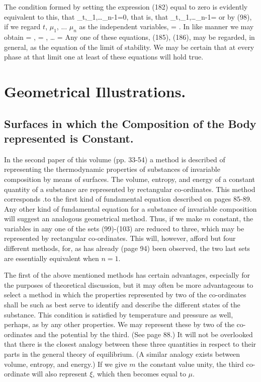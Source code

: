 \documentclass[12pt]{article}
\begin{document}
The condition formed by setting the expression (182) equal to zero is evidently equivalent to this, that
\eqs
{}_{t,\mu_1,\dots\mu_{n-1}}=0,\label{183}
\eqe
that is, that
\eqs 
{}_{t,\mu_1,\dots\mu_{n-1}}=\infty \label{184}
\eqe
or by (98), if we regard $t$, $\mu_1$, ... $\mu_n$ as the independent variables,
\eqs {} = \infty.   \label{185}\eqe
In like manner we may obtain
\eqs {} = \infty,  = \infty, \dots {} = \infty \label{186}\eqe
Any one of these equations, (185), (186), may be regarded, in general, as the equation of the limit of stability. We may be certain that at every phase at that limit one at least of these equations will hold true.
\section{Geometrical Illustrations.}
\subsection{Surfaces in which the Composition of the Body represented is Constant.}
In the second paper of this volume (pp. 33-54) a method is described of representing the thermodynamic properties of substances of invariable composition by means of surfaces. The volume, entropy, and energy of a constant quantity of a substance are represented by rectangular co-ordinates.  This method corresponds .to the first kind of fundamental equation described on pages 85-89. Any other kind of fundamental equation for a substance of invariable composition will suggest an analogous geometrical method. Thus, if we make $m$ constant, the variables in any one of the sets (99)-(103) are reduced to three, which may be represented by rectangular co-ordinates. This will, however, afford but four different methods, for, as has already (page 94) been observed, the two last sets are essentially equivalent when $n= 1$.


The first of the above mentioned methods has certain advantages, especially for the purposes of theoretical discussion, but it may often be more advantageous to select a method in which the properties represented by two of the co-ordinates shall be such as best serve to identify and describe the different states of the substance. This condition is satisfied by temperature and pressure as well, perhaps, as by any other properties.  We may represent these by two of the co-ordinates and the potential by the third. (See page 88.) It will not be overlooked that there is the closest analogy between these three quantities in respect to their parts in the general theory of equilibrium. (A similar analogy exists between volume, entropy, and energy.) If we give $m$ the constant value unity, the third co-ordinate will also represent $\xi$, which then becomes equal to $\mu$.
\end{document}

